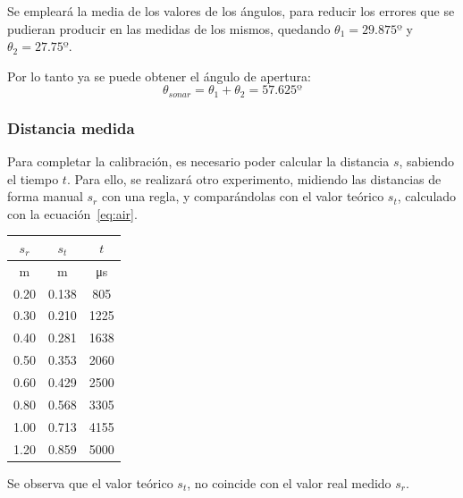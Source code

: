\documentclass[10pt,a4paper,hidelinks]{article}
\begin{document}
\begin{multicols}{2}
Se empleará la media de los valores de los ángulos, para reducir los errores que
se pudieran producir en las medidas de los mismos, quedando $\theta_1 = 29.875
º$ y $\theta_2 = 27.75 º$.

Por lo tanto ya se puede obtener el ángulo de apertura:
$$\theta_{sonar} = \theta_1 + \theta_2 = 57.625 º $$

\subsubsection{Distancia medida}

Para completar la calibración, es necesario poder calcular la distancia $s$,
sabiendo el tiempo $t$. Para ello, se realizará otro experimento, midiendo las
distancias de forma manual $s_r$ con una regla, y comparándolas con el valor
teórico $s_t$, calculado con la ecuación~\ref{eq:air}.

\begin{center}
\begin{tabular}{ | c | c | c | }
\hline
$s_{r}$ & $s_{t}$ & $t$ \\ \hline
m & m & \si{\micro\second} \\ \hline \hline
0.20 & 0.138 &  805 \\ \hline
0.30 & 0.210 & 1225 \\ \hline
0.40 & 0.281 & 1638 \\ \hline
0.50 & 0.353 & 2060 \\ \hline
0.60 & 0.429 & 2500 \\ \hline
0.80 & 0.568 & 3305 \\ \hline
1.00 & 0.713 & 4155 \\ \hline
1.20 & 0.859 & 5000 \\ \hline
\end{tabular}
\end{center}

Se observa que el valor teórico $s_t$, no coincide con el valor real medido 
$s_r$.


\end{multicols}
\end{document}
